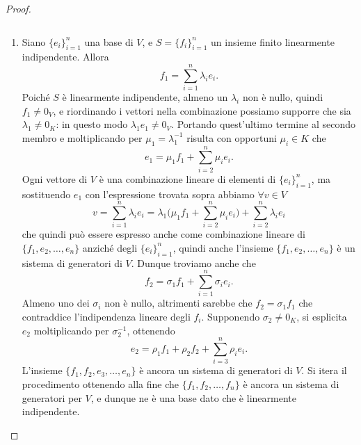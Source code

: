 \begin{proof}
\begin{verbatim}

\end{verbatim}
	\begin{enumerate}
		\item Siano $\{  e_i\}_{i=1}^n$ una base di $V$, e $S=\{  f_i\}_{i=1}^n$ un insieme finito linearmente indipendente.
			Allora
			\begin{equation*}
				  f_1=\sum_{i=1}^n\lambda_i  e_i.
			\end{equation*}
			Poiché $S$ è linearmente indipendente, almeno un $\lambda_i$ non è nullo, quindi $  f_1\neq 0_V$, e riordinando i vettori nella combinazione possiamo supporre che sia $\lambda_1\neq 0_K$: in questo modo $\lambda_1  e_1\neq 0_V$.
			Portando quest'ultimo termine al secondo membro e moltiplicando per $\mu_1=\lambda_1^{-1}$ risulta con opportuni $\mu_i\in K$ che
			\begin{equation*}
				  e_1=\mu_1  f_1+\sum_{i=2}^n\mu_i  e_i.
			\end{equation*}
			Ogni vettore di $V$ è una combinazione lineare di elementi di $\{  e_i\}_{i=1}^n$, ma sostituendo $  e_1$ con l'espressione trovata sopra abbiamo $\forall  v\in V$
			\begin{equation*}
				  v=\sum_{i=1}^n\lambda_i  e_i=\lambda_1\bigg(\mu_1  f_1+\sum_{i=2}^n\mu_i  e_i\bigg)+\sum_{i=2}^n\lambda_i  e_i
			\end{equation*}
			che quindi può essere espresso anche come combinazione lineare di $\{  f_1,  e_2,\dots,  e_n\}$ anziché degli $\{  e_i\}_{i=1}^n$, quindi anche l'insieme $\{  f_1,  e_2,\dots,  e_n\}$ è un sistema di generatori di $V$.
			Dunque troviamo anche che
			\begin{equation*}
				  f_2=\sigma_1  f_1+\sum_{i=1}^n\sigma_i  e_i.
			\end{equation*}
			Almeno uno dei $\sigma_i$ non è nullo, altrimenti sarebbe che $  f_2=\sigma_1  f_1$ che contraddice l'indipendenza lineare degli $  f_i$.
			Supponendo $\sigma_2\neq 0_K$, si esplicita $  e_2$ moltiplicando per $\sigma_2^{-1}$, ottenendo
			\begin{equation*}
				  e_2=\rho_1  f_1+\rho_2  f_2+\sum_{i=3}^n\rho_i  e_i.
			\end{equation*}
			L'insieme $\{  f_1,  f_2,  e_3,\dots,  e_n\}$ è ancora un sistema di generatori di $V$.
			Si itera il procedimento ottenendo alla fine che $\{  f_1,  f_2,\dots,  f_n\}$ è ancora un sistema di generatori per $V$, e dunque ne è una base dato che è linearmente indipendente. 

\end{enumerate}
\end{proof}

